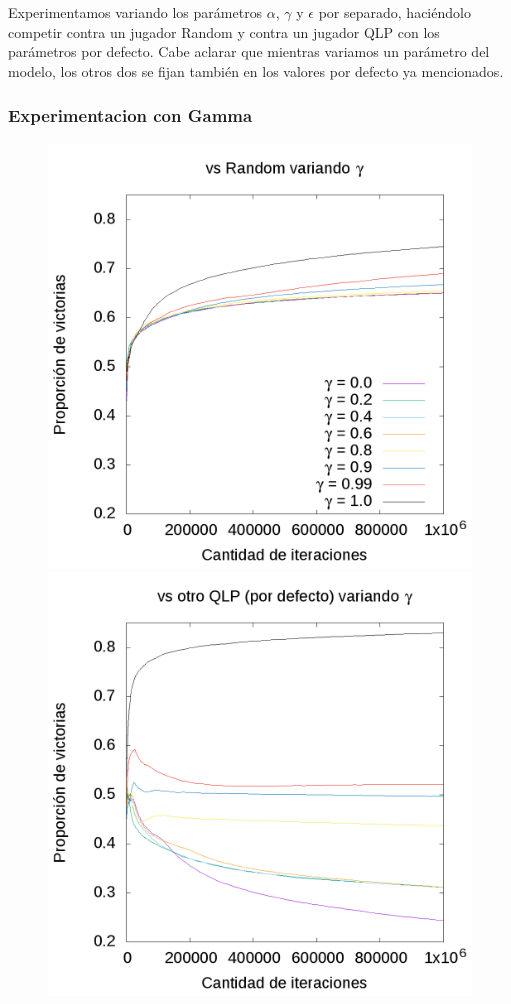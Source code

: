 \documentclass[10pt, a4paper]{article}
\begin{document}
Experimentamos variando los parámetros $\alpha$, $\gamma$ y $\epsilon$ por separado, haciéndolo competir contra un jugador Random y contra un jugador QLP con los parámetros por defecto.
Cabe aclarar que mientras variamos un parámetro del modelo, los otros dos se fijan también en los valores por defecto ya mencionados.

\subsubsection{Experimentacion con Gamma}
\begin{figure}[H]
 \centering
  \begin{minipage}[c]{1\textwidth}
	\includegraphics[scale=0.2]{GammaR.png}
	\includegraphics[scale=0.2]{GammaQ.png}

\end{minipage}
\end{figure}
\end{document}
